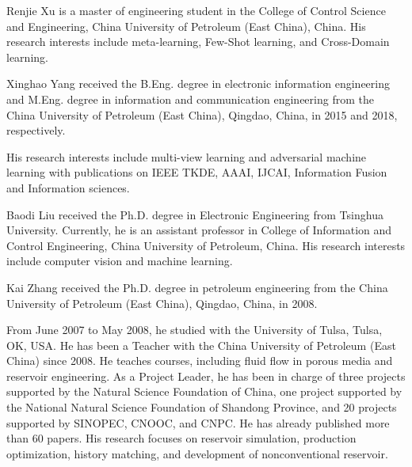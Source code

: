 \documentclass[10pt,journal,compsoc]{IEEEtran}
\begin{document}
\begin{IEEEbiography}{Renjie Xu}
is a master of engineering student in the College of Control Science and Engineering, China University of Petroleum (East China), China. His research interests include meta-learning, Few-Shot learning, and Cross-Domain learning.
\end{IEEEbiography}

\begin{IEEEbiography}{Xinghao Yang}
received the B.Eng. degree in electronic information engineering and M.Eng. degree in information and communication engineering from the China University of Petroleum (East China), Qingdao, China, in 2015 and 2018, respectively. 

His research interests include multi-view learning and adversarial machine learning with publications on IEEE TKDE, AAAI, IJCAI, Information Fusion and Information sciences.
\end{IEEEbiography}

\begin{IEEEbiography}{Baodi Liu}
received the Ph.D. degree in Electronic Engineering from Tsinghua University. Currently, he is an assistant professor in College of Information and
Control Engineering, China University of Petroleum, China. His research interests include computer vision and machine learning.
\end{IEEEbiography}

\begin{IEEEbiography}{Kai Zhang}
received the Ph.D. degree in petroleum engineering from the China
University of Petroleum (East China), Qingdao, China, in 2008.

From June 2007 to May 2008, he studied with the University of Tulsa, Tulsa, OK, USA. He has been a Teacher with the China University of Petroleum (East China) since 2008. He teaches courses, including fluid flow in porous media and reservoir engineering. As a Project Leader, he has been in charge of three projects supported by the Natural Science Foundation of China, one project supported by the National Natural Science Foundation of Shandong Province, and 20 projects supported by SINOPEC, CNOOC, and CNPC. He has already published more than 60 papers. His research focuses on reservoir simulation, production optimization, history matching, and development of nonconventional reservoir.
\end{IEEEbiography}
\end{document}
